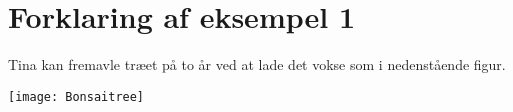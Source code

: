 \section*{Forklaring af eksempel 1}
Tina kan fremavle træet på to år ved at lade det vokse som i nedenstående figur.

\begin{center}
\texttt{[image: Bonsaitree]}
\end{center}
